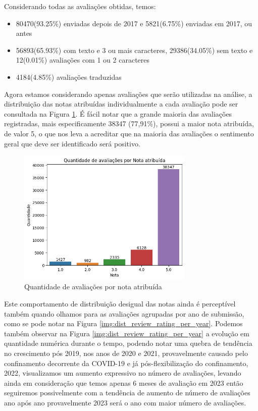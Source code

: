 Considerando todas as avaliações obtidas, temos:

\begin{itemize}
	\item 80470(93.25\%) enviadas depois de 2017 e 5821(6.75\%) enviadas em 2017, ou antes
	\item 56893(65.93\%) com texto e 3 ou mais caracteres, 29386(34.05\%) sem texto e 12(0.01\%) avaliações com 1 ou 2 caracteres
	\item 4184(4.85\%) avaliações traduzidas
\end{itemize}

Agora estamos considerando apenas avaliações que serão utilizadas na análise, a distribuição das notas atribuídas individualmente a cada avaliação pode ser consultada na Figura \ref{img:dist_review_rating}. É fácil notar que a grande maioria das avaliações registradas, mais especificamente 38347 (77,91\%), possui a maior nota atribuída, de valor 5, o que nos leva a acreditar que na maioria das avaliações o sentimento geral que deve ser identificado será positivo.

\begin{figure}
	\centering
	\includegraphics[width=0.75\textwidth]{figs/exploratoria/quantidade_avaliacao_nota_atribuida.png}
	\caption{Quantidade de avaliações por nota atribuída}
	\label{img:dist_review_rating}
\end{figure}

Este comportamento de distribuição desigual das notas ainda é perceptível também quando olhamos para as avaliações agrupadas por ano de submissão, como se pode notar na Figura \ref{img:dist_review_rating_per_year}. Podemos também observar na Figura \ref{img:dist_review_rating_per_year} a evolução em quantidade numérica durante o tempo, podendo notar uma quebra de tendência no crescimento pós 2019, nos anos de 2020 e 2021, provavelmente causado pelo confinamento decorrente da COVID-19 \cite{Guardia2022} e já pós-flexibilização do confinamento, 2022, visualizamos um aumento expressivo no número de avaliações, levando ainda em consideração que temos apenas 6 meses de avaliação em 2023 então seguiremos possivelmente com a tendência de aumento de número de avaliações ano após ano provavelmente 2023 será o ano com maior número de avaliações.

